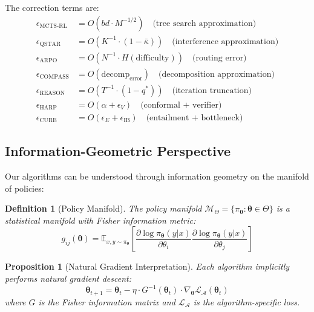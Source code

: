 \documentclass[11pt,a4paper]{article}
\newtheorem{proposition}[theorem]{Proposition}
\newtheorem{definition}[theorem]{Definition}
\newcommand{\E}{\mathbb{E}}
\newcommand{\calL}{\mathcal{L}}
\newcommand{\calM}{\mathcal{M}}
\newcommand{\calA}{\mathcal{A}}
\newcommand{\btheta}{\bm{\theta}}
\begin{document}
The correction terms are:
\begin{align}
    \epsilon_{\text{MCTS-RL}} &= O(bd \cdot M^{-1/2}) \quad \text{(tree search approximation)} \\
    \epsilon_{\text{QSTAR}} &= O(K^{-1} \cdot (1 - \bar{\kappa})) \quad \text{(interference approximation)} \\
    \epsilon_{\text{ARPO}} &= O(N^{-1} \cdot H(\text{difficulty})) \quad \text{(routing error)} \\
    \epsilon_{\text{COMPASS}} &= O(\text{decomp}_{\text{error}}) \quad \text{(decomposition approximation)} \\
    \epsilon_{\text{REASON}} &= O(T^{-1} \cdot (1-q^*)) \quad \text{(iteration truncation)} \\
    \epsilon_{\text{HARP}} &= O(\alpha + \epsilon_V) \quad \text{(conformal + verifier)} \\
    \epsilon_{\text{CURE}} &= O(\epsilon_E + \epsilon_{\text{IB}}) \quad \text{(entailment + bottleneck)}
\end{align}

\subsection{Information-Geometric Perspective}

Our algorithms can be understood through information geometry on the manifold of policies:

\begin{definition}[Policy Manifold]
The policy manifold $\calM_\Theta = \{\pi_\btheta : \btheta \in \Theta\}$ is a statistical manifold with Fisher information metric:
\begin{equation}
    g_{ij}(\btheta) = \E_{x,y \sim \pi_\btheta}\left[\frac{\partial \log \pi_\btheta(y|x)}{\partial \theta_i} \frac{\partial \log \pi_\btheta(y|x)}{\partial \theta_j}\right]
\end{equation}
\end{definition}

\begin{proposition}[Natural Gradient Interpretation]
Each algorithm implicitly performs natural gradient descent:
\begin{equation}
    \btheta_{t+1} = \btheta_t - \eta \cdot G^{-1}(\btheta_t) \cdot \nabla_\btheta \calL_{\calA}(\btheta_t)
\end{equation}
where $G$ is the Fisher information matrix and $\calL_{\calA}$ is the algorithm-specific loss.
\end{proposition}
\end{document}
